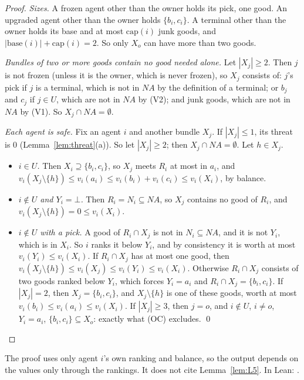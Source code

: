 \documentclass[runningheads,11pt]{llncs}
\newcommand{\NA}{\mathit{NA}}
\newcommand{\capa}{\mathrm{cap}}
\newcommand{\base}{\mathrm{base}}
\newcommand{\none}{\bot}
\begin{document}
\begin{proof}
\emph{Sizes.} A frozen agent other than the owner holds its pick, one good. An upgraded agent other than the owner holds $\{b_i,c_i\}$. A terminal other than the owner holds its base and at most $\capa(i)$ junk goods, and $|\base(i)|+\capa(i)=2$. So only $X_o$ can have more than two goods.

\emph{Bundles of two or more goods contain no good needed alone.} Let $|X_j|\ge2$. Then $j$ is not frozen (unless it is the owner, which is never frozen), so $X_j$ consists of: $j$'s pick if $j$ is a terminal, which is not in $\NA$ by the definition of a terminal; or $b_j$ and $c_j$ if $j\in U$, which are not in $\NA$ by (V2); and junk goods, which are not in $\NA$ by (V1). So $X_j\cap\NA=\emptyset$.

\emph{Each agent is safe.} Fix an agent $i$ and another bundle $X_j$. If $|X_j|\le1$, its threat is $0$ (Lemma~\ref{lem:threat}(a)). So let $|X_j|\ge2$; then $X_j\cap\NA=\emptyset$. Let $h\in X_j$.
\begin{itemize}
\item \emph{$i\in U$.} Then $X_i\supseteq\{b_i,c_i\}$, so $X_j$ meets $R_i$ at most in $a_i$, and $v_i(X_j\setminus\{h\})\le v_i(a_i)\le v_i(b_i)+v_i(c_i)\le v_i(X_i)$, by balance.
\item \emph{$i\notin U$ and $Y_i=\none$.} Then $R_i=N_i\subseteq\NA$, so $X_j$ contains no good of $R_i$, and $v_i(X_j\setminus\{h\})=0\le v_i(X_i)$.
\item \emph{$i\notin U$ with a pick.} A good of $R_i\cap X_j$ is not in $N_i\subseteq\NA$, and it is not $Y_i$, which is in $X_i$. So $i$ ranks it below $Y_i$, and by consistency it is worth at most $v_i(Y_i)\le v_i(X_i)$. If $R_i\cap X_j$ has at most one good, then $v_i(X_j\setminus\{h\})\le v_i(X_j)\le v_i(Y_i)\le v_i(X_i)$. Otherwise $R_i\cap X_j$ consists of two goods ranked below $Y_i$, which forces $Y_i=a_i$ and $R_i\cap X_j=\{b_i,c_i\}$. If $|X_j|=2$, then $X_j=\{b_i,c_i\}$, and $X_j\setminus\{h\}$ is one of these goods, worth at most $v_i(b_i)\le v_i(a_i)\le v_i(X_i)$. If $|X_j|\ge3$, then $j=o$, and $i\notin U$, $i\ne o$, $Y_i=a_i$, $\{b_i,c_i\}\subseteq X_o$: exactly what (OC) excludes. \qed
\end{itemize}
\end{proof}

\noindent The proof uses only agent $i$'s own ranking and balance, so the output depends on the values only through the rankings. It does not cite Lemma~\ref{lem:L5}. In Lean: .
\end{document}
